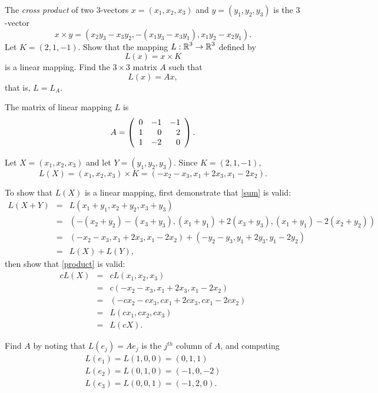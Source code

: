 \documentclass{ximera}
\begin{document}
\begin{exercise} \label{c4.3.8}
The {\em cross product\/} of two $3$-vectors $x=(x_1,x_2,x_3)$
and $y=(y_1,y_2,y_3)$ is the $3$-vector
\[
x\times y = (x_2y_3-x_3y_2,-(x_1y_3-x_3y_1),x_1y_2-x_2y_1).
\]
Let $K=(2,1,-1)$.  Show that the mapping $L:\mbox{$\Bbb{R}$}^3\to\mbox{$\Bbb{R}$}^3$ defined by
\[
L(x) = x\times K
\]
is a linear mapping.  Find the $3\times 3$ matrix $A$ such that
\[
L(x) = Ax,
\]
that is, $L=L_A$.

\begin{solution}

\ans The matrix of linear mapping $L$ is
\[
A = \left(\begin{array}{rrr} 0 & -1 & -1 \\ 1 & 0 & 2 \\ 1 & -2 & 0\end{array}\right).
\]

\soln Let $X = (x_1,x_2,x_3)$ and let $Y = (y_1,y_2,y_3)$.  
Since $K = (2,1,-1)$,
\[
L(X) = (x_1,x_2,x_3) \times K = 
(-x_2 - x_3, x_1 + 2x_3, x_1 - 2x_2).
\]

To show that $L(X)$ is a linear mapping, first demonstrate that
\eqref{sum} is valid:
\[
\begin{array}{rcl}
L(X + Y) & = & L(x_1 + y_1,x_2 + y_2,x_3 + y_3) \\
& = & (-(x_2 + y_2) - (x_3 + y_3), (x_1 + y_1) + 2(x_3 + y_3),
(x_1 + y_1) - 2(x_2 + y_2)) \\
& = & (-x_2 - x_3, x_1 + 2x_3, x_1 - 2x_2) +
(-y_2 - y_3, y_1 + 2y_3, y_1 - 2y_2) \\
& = & L(X) + L(Y), \end{array}
\]
then show that \eqref{product} is valid:
\[
\begin{array}{rcl}
cL(X) & = & cL(x_1,x_2,x_3) \\
& = & c(-x_2 - x_3, x_1 + 2x_3, x_1 - 2x_2) \\
& = & (-cx_2 - cx_3, cx_1 + 2cx_3, cx_1 - 2cx_2) \\
& = & L(cx_1,cx_2,cx_3) \\
& = & L(cX). \end{array}
\]

Find $A$ by noting that $L(e_j) = Ae_j$ is the $j^{th}$ column of $A$,
and computing
\[ \begin{array}{l}
L(e_1) = L(1,0,0) = (0,1,1) \\
L(e_2) = L(0,1,0) = (-1,0,-2) \\
L(e_3) = L(0,0,1) = (-1,2,0). \end{array} \]


\end{solution}
\end{exercise}
\end{document}
